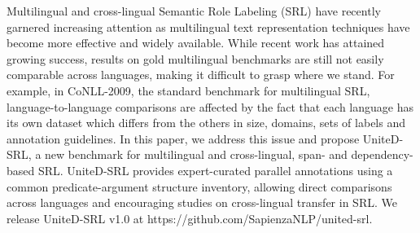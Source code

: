 Multilingual and cross-lingual Semantic Role Labeling (SRL) have recently garnered increasing attention as multilingual text representation techniques have become more effective and widely available. While recent work has attained growing success, results on gold multilingual benchmarks are still not easily comparable across languages, making it difficult to grasp where we stand. For example, in CoNLL-2009, the standard benchmark for multilingual SRL, language-to-language comparisons are affected by the fact that each language has its own dataset which differs from the others in size, domains, sets of labels and annotation guidelines. In this paper, we address this issue and propose UniteD-SRL, a new benchmark for multilingual and cross-lingual, span- and dependency-based SRL. UniteD-SRL provides expert-curated parallel annotations using a common predicate-argument structure inventory, allowing direct comparisons across languages and encouraging studies on cross-lingual transfer in SRL. We release UniteD-SRL v1.0 at https://github.com/SapienzaNLP/united-srl.
